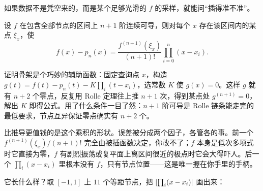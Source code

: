 如果数据不是凭空来的，而是某个足够光滑的 \(f\) 的采样，就能问``插得准不准''。

\begin{theorem}
设 \(f\) 在包含全部节点的区间上 \(n+1\) 阶连续可导，则对每个 \(x\) 存在该区间内的某点 \(\xi_x\)，使
\[
f(x)-p_n(x)=\frac{f^{(n+1)}(\xi_x)}{(n+1)!}\prod_{i=0}^{n}(x-x_i).
\]
\end{theorem}

证明骨架是个巧妙的辅助函数：固定查询点 \(x\)，构造 \(g(t)=f(t)-p_n(t)-K\prod_i(t-x_i)\)，选常数 \(K\) 使 \(g(x)=0\)。这样 \(g\) 就有 \(n+2\) 个零点，反复用 Rolle 定理往上推 \(n+1\) 次，得到某点处 \(g^{(n+1)}=0\)，解出 \(K\) 即得公式。用了什么条件一目了然：\(n+1\) 阶可导是 Rolle 链条能走完的最低要求，节点互异保证零点确实有 \(n+2\) 个。

比推导更值钱的是这个乘积的形状。误差被分成两个因子，各管各的事。前一个 \(f^{(n+1)}(\xi_x)/(n+1)!\) 完全由被插函数决定，你改不了；\(f\) 本身是低次多项式时它直接为零，\(f\) 有剧烈振荡或复平面上离区间很近的极点时它会大得吓人。后一个 \(\prod_i(x-x_i)\) 里根本没有 \(f\)，只有节点位置——这是唯一握在你手里的手柄。

它长什么样？取 \([-1,1]\) 上 \(11\) 个等距节点，把 \(\left|\prod_i(x-x_i)\right|\) 画出来：

